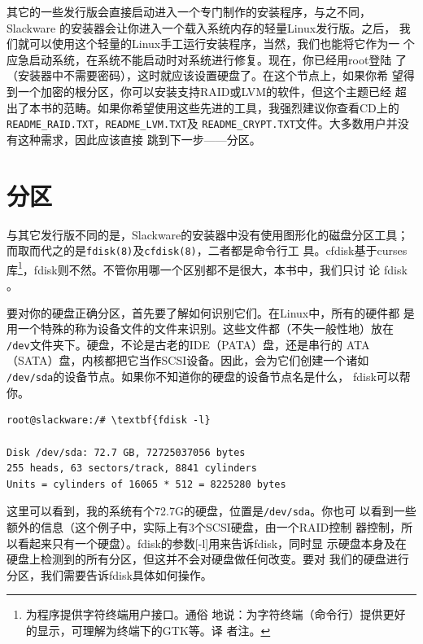 其它的一些发行版会直接启动进入一个专门制作的安装程序，与之不同，
Slackware 的安装器会让你进入一个载入系统内存的轻量Linux发行版。之后，
我们就可以使用这个轻量的Linux手工运行安装程序，当然，我们也能将它作为一
个应急启动系统，在系统不能启动时对系统进行修复。现在，你已经用root登陆
了（安装器中不需要密码），这时就应该设置硬盘了。在这个节点上，如果你希
望得到一个加密的根分区，你可以安装支持RAID或LVM的软件，但这个主题已经
超出了本书的范畴。如果你希望使用这些先进的工具，我强烈建议你查看CD上的
\texttt{README\_RAID.TXT}，\texttt{README\_LVM.TXT}及
\texttt{README\_CRYPT.TXT}文件。大多数用户并没有这种需求，因此应该直接
跳到下一步——分区。

\section{分区}
\label{sec:installation:partition}

与其它发行版不同的是，Slackware的安装器中没有使用图形化的磁盘分区工具；
而取而代之的是\texttt{fdisk(8)}及\texttt{cfdisk(8)}，二者都是命令行工
具。cfdisk基于curses库\footnote{为程序提供字符终端用户接口。通俗
  地说：为字符终端（命令行）提供更好的显示，可理解为终端下的GTK等。译
  者注。}，fdisk则不然。不管你用哪一个区别都不是很大，本书中，我们只讨
论 fdisk 。

要对你的硬盘正确分区，首先要了解如何识别它们。在Linux中，所有的硬件都
是用一个特殊的称为设备文件的文件来识别。这些文件都（不失一般性地）放在
\texttt{/dev}文件夹下。硬盘，不论是古老的IDE（PATA）盘，还是串行的
ATA（SATA）盘，内核都把它当作SCSI设备。因此，会为它们创建一个诸如
\texttt{/dev/sda}的设备节点。如果你不知道你的硬盘的设备节点名是什么，
fdisk可以帮你。
\begin{Verbatim}[frame=single,commandchars=\\\{\}]
root@slackware:/# \textbf{fdisk -l}

Disk /dev/sda: 72.7 GB, 72725037056 bytes
255 heads, 63 sectors/track, 8841 cylinders
Units = cylinders of 16065 * 512 = 8225280 bytes
\end{Verbatim}
这里可以看到，我的系统有个72.7G的硬盘，位置是\texttt{/dev/sda}。你也可
以看到一些额外的信息（这个例子中，实际上有3个SCSI硬盘，由一个RAID控制
器控制，所以看起来只有一个硬盘）。fdisk的参数[-l]用来告诉fdisk，同时显
示硬盘本身及在硬盘上检测到的所有分区，但这并不会对硬盘做任何改变。要对
我们的硬盘进行分区，我们需要告诉fdisk具体如何操作。

